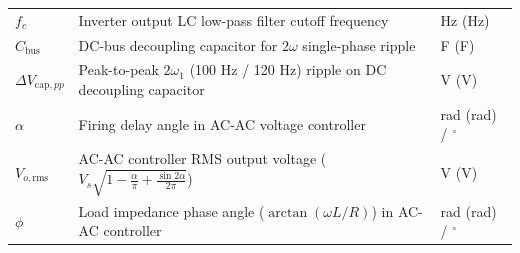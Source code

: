 \begin{center}
\begin{tabular}{@{}lll@{}}
$f_c$ & Inverter output LC low-pass filter cutoff frequency & \si{\hertz} (Hz) \\
$C_{\mathrm{bus}}$ & DC-bus decoupling capacitor for $2\omega$ single-phase ripple & \si{\farad} (F) \\
$\Delta V_{\mathrm{cap},pp}$ & Peak-to-peak $2\omega_1$ (100 Hz / 120 Hz) ripple on DC decoupling capacitor & \si{\volt} (V) \\
$\alpha$ & Firing delay angle in AC-AC voltage controller & \si{\radian} (rad) / $^\circ$ \\
$V_{o,\mathrm{rms}}$ & AC-AC controller RMS output voltage ($V_s \sqrt{1 - \frac{\alpha}{\pi} + \frac{\sin 2\alpha}{2\pi}}$) & \si{\volt} (V) \\
$\phi$ & Load impedance phase angle ($\arctan(\omega L / R)$) in AC-AC controller & \si{\radian} (rad) / $^\circ$ \\
\bottomrule
\end{tabular}
\end{center}

